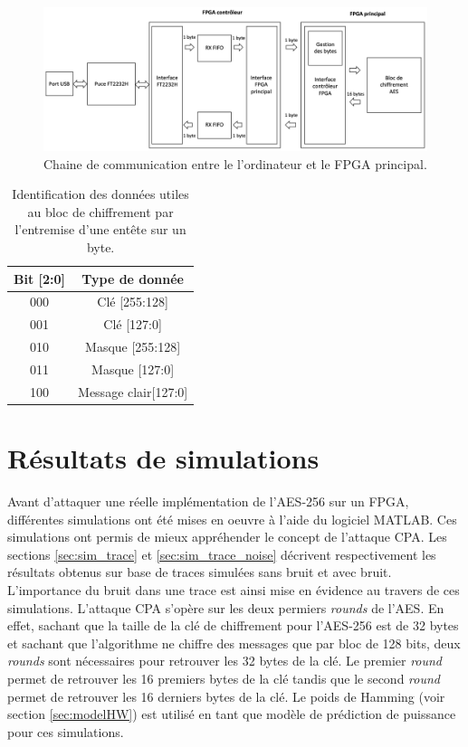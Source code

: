 \documentclass[oneside]{book}
\begin{document}
\begin{figure}[htbp]
    \hspace{-1.5cm}
    \includegraphics[scale=0.58]{image/FPGA_Controler}
    \caption{Chaine de communication entre le l'ordinateur et le FPGA principal.}
    \label{fig:FPGA_Controler}
    \vspace{0.5cm}
\end{figure}

\begin{table}[htbp]
	\centering
	\begin{tabular}{|c|c|}
    		\hline
  		  \textbf{Bit [2:0]} &\textbf{ Type de donnée} \\ \hline 
		  000 & Clé [255:128] \\ \hline 
  		  001 & Clé [127:0]  \\ \hline
		  010 & Masque [255:128]  \\ \hline
		  011 & Masque [127:0]  \\ \hline 
 		  100 & Message clair[127:0] \\ \hline
	\end{tabular}
    	\caption{Identification des données utiles au bloc de chiffrement par l'entremise d'une entête sur un byte.}
    	\label{tab:header} 
\end{table}
 
\newpage



\section{Résultats de simulations}
\label{sec:Sim_results_CPA}

Avant d'attaquer une réelle implémentation de l'AES-256 sur un FPGA, différentes simulations ont été mises en oeuvre à l'aide du logiciel MATLAB. Ces simulations ont permis de mieux appréhender le concept de l'attaque CPA. Les sections \ref{sec:sim_trace} et \ref{sec:sim_trace_noise} décrivent respectivement les résultats obtenus sur base de traces simulées sans bruit et avec bruit. L'importance du bruit dans une trace est ainsi mise en évidence au travers de ces simulations. L'attaque CPA s'opère sur les deux permiers \textit{rounds} de l'AES. En effet, sachant que la taille de la clé de chiffrement pour l'AES-256 est de 32 bytes et sachant que l'algorithme ne chiffre des messages que par bloc de 128 bits, deux \textit{rounds} sont nécessaires pour retrouver les 32 bytes de la clé. Le premier \textit{round} permet de retrouver les 16 premiers bytes de la clé tandis que le second \textit{round} permet de retrouver les 16 derniers bytes de la clé. Le poids de Hamming (voir section \ref{sec:modelHW}) est utilisé en tant que modèle de prédiction de puissance pour ces simulations.
\end{document}
